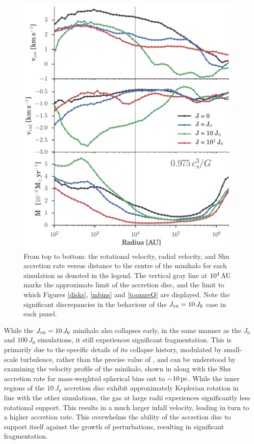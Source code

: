 \documentclass[../thesis.tex]{subfiles}
\begin{document}
\begin{figure}
  \begin{center}
    \includegraphics[width=\columnwidth]{figures/radial_bins/core_profile}
    \caption{From top to bottom: the rotational velocity, radial velocity, and Shu accretion rate versus distance to the centre of the minihalo for each simulation as denoted in the legend.  The vertical gray line at $10^4\,\mathrm{AU}$ marks the approximate limit of the accretion disc, and the limit to which Figures \ref{disks}, \ref{mbins} and \ref{toomreQ} are displayed.  Note the significant discrepancies in the behaviour of the $J_{\textsc{xr}}=10\,J_0$ case in each panel.}
    \label{core_profile}
  \end{center}
\end{figure}
While the $J_{\textsc{xr}}=10\,J_0$ minihalo also collapses early, in the same manner as the $J_0$ and $100\,J_0$ simulations, it still experiences significant fragmentation.  This is primarily due to the specific details of its collapse history, modulated by small-scale turbulence, rather than the precise value of \jxr, and can be understood by examining the velocity profile of the minihalo, shown in  along with the Shu accretion rate \citep{Shu1977} for mass-weighted spherical bins out to $\sim$$10\,\mathrm{pc}$. While the inner regions of the $10\,J_0$ accretion disc exhibit approximately Keplerian rotation in line with the other simulations, the gas at large radii experiences significantly less rotational support.  This results in a much larger infall velocity, leading in turn to a higher accretion rate.  This overwhelms the ability of the accretion disc to support itself against the growth of perturbations, resulting in significant fragmentation.
\end{document}
